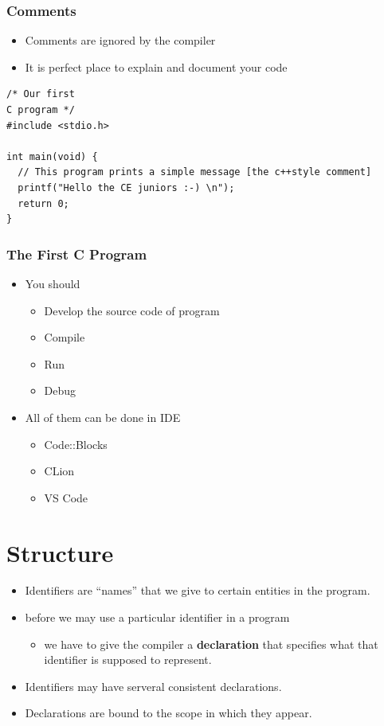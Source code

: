 \documentclass{../c-lecture}
\begin{document}
\begin{frame}[fragile]
  \frametitle{Comments}
  \begin{itemize}
    \item Comments are ignored by the compiler
    \item It is perfect place to explain and document your code
  \end{itemize}
  \begin{verbatim}
/* Our first
C program */
#include <stdio.h>

int main(void) {
  // This program prints a simple message [the c++style comment]
  printf("Hello the CE juniors :-) \n");
  return 0;
}
  \end{verbatim}
\end{frame}

\begin{frame}
  \frametitle{The First C Program}
  \begin{itemize}
    \item You should
    \begin{itemize}
      \item Develop the source code of program
      \item Compile
      \item Run
      \item Debug
    \end{itemize}
    \item All of them can be done in IDE
    \begin{itemize}
      \item Code::Blocks
      \item CLion
      \item VS Code
    \end{itemize}
  \end{itemize}
\end{frame}

\section{Structure}

\begin{frame}
  \begin{itemize}
    \item Identifiers are ``names'' that we give to certain entities in the program.
    \item before we may use a particular identifier in a program
    \begin{itemize}
      \item we have to give the compiler a \textbf{\color{Peach} declaration} that specifies what that identifier is supposed to represent.
    \end{itemize}
    \item Identifiers may have serveral consistent declarations.
    \item Declarations are bound to the scope in which they appear.
  \end{itemize}
\end{frame}
\end{document}
